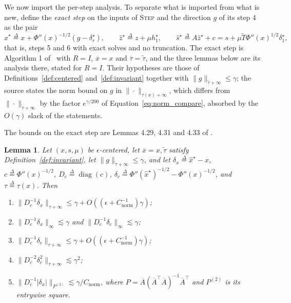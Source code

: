 \documentclass[11pt]{article}
\newtheorem{lemma}{Lemma}[section]
\newcommand{\diag}{\operatorname{diag}}
\newcommand{\xhat}{\widehat{x}}
\newcommand{\shat}{\widehat{s}}
\newcommand{\zhat}{\widehat{z}}
\newcommand{\tautil}{\widetilde{\tau}}
\newcommand{\defeq}{\stackrel{\Delta}{=}}
\newcommand{\Cnorm}{C_{\mathrm{norm}}}
\begin{document}
We now import the per-step analysis.
To separate what is imported from what is new, define the \emph{exact step} on
the inputs of \textsc{Step} and the direction $g$ of its step 4 as the pair
\begin{equation}
\label{eq:exact_step}
\xhat^{\star}
\defeq
x + \Phi''(x)^{-1/2} \left( g - \delta_r^{\star} \right),
\qquad
\zhat^{\star}
\defeq
z + \mu h_1^{\star},
\qquad
\shat^{\star}
\defeq
A \zhat^{\star} + c
=
s + \mu \widetilde{T} \Phi''(x)^{1/2} \delta_1^{\star},
\end{equation}
that is, steps 5 and 6 with exact solves and no truncation.
The exact step is Algorithm 1
of~\cite{BLLSSSW21} with $R = I$,
$\overline{x} = x$ and
$\overline{\tau} = \tautil$, and the three lemmas below are its analysis there,
stated for $R = I$.
Their hypotheses are those of Definitions~\ref{def:centered}
and~\ref{def:invariant} together with $\|g\|_{\tautil + \infty} \le \gamma$; the
source states the norm bound on $g$ in
$\|\cdot\|_{\tau(x) + \infty}$, which differs from
$\|\cdot\|_{\tautil + \infty}$ by the factor
$e^{\gamma / 200}$ of Equation~\eqref{eq:norm_compare}, absorbed by the
$O(\gamma)$ slack of the statements.

The bounds on the exact step are Lemmas 4.29, 4.31 and 4.33 of
\cite{BLLSSSW21}.

\begin{lemma}
\label{lem:step_bounds}
Let $(x, s, \mu)$ be
$\epsilon$-centered, let
$\overline{x} = x, \tautil$ satisfy Definition~\ref{def:invariant}, let
$\|g\|_{\tautil + \infty} \le \gamma$, and let
$\delta_x \defeq \xhat^{\star} - x$,
$c \defeq \Phi''(x)^{-1/2}$,
$D_c \defeq \diag(c)$,
$\delta_c \defeq \Phi''(\xhat^{\star})^{-1/2} - \Phi''(x)^{-1/2}$, and
$\tau \defeq \tau(x)$.
Then
\begin{enumerate}
\item \label{itm:step_bounds:1}
  $\|D_c^{-1} \delta_x\|_{\tau + \infty} \le \gamma + O( (\epsilon + \Cnorm^{-1}) \gamma )$;
\item \label{itm:step_bounds:2} $\|D_c^{-1} \delta_x\|_{\infty} \lesssim \gamma$
  and $\|D_c^{-1} \delta_c\|_{\infty} \lesssim \gamma$;
\item \label{itm:step_bounds:3}
  $\|D_c^{-1} \delta_c\|_{\tau + \infty} \le \gamma + O( (\epsilon + \Cnorm^{-1}) \gamma )$;
\item \label{itm:step_bounds:4}
  $\|D_c^{-2} \delta_c^2\|_{\tau + \infty} \lesssim \gamma^2$;
\item \label{itm:step_bounds:5}
  $\|D_c^{-1} |\delta_x| \|_{P^{(2)}} \lesssim \gamma / \Cnorm$, where
  $P = \overline{A}(\overline{A}^\top \overline{A})^{-1}\overline{A}^\top$ and
  $P^{(2)}$ is its entrywise square.
\end{enumerate}
\end{lemma}
\end{document}
